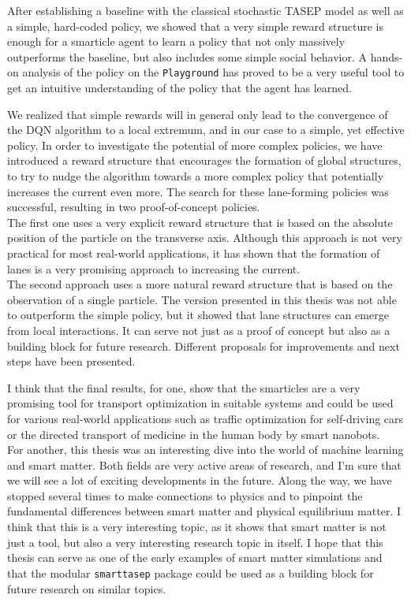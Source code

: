 After establishing a baseline with the classical stochastic TASEP model as well as a simple, hard-coded policy, we showed that a very simple reward structure is enough for a smarticle agent to learn a policy that not only massively outperforms the baseline, but also includes some simple social behavior. A hands-on analysis of the policy on the \texttt{Playground} has proved to be a very useful tool to get an intuitive understanding of the policy that the agent has learned.


We realized that simple rewards will in general only lead to the convergence of the DQN algorithm to a local extremum, and in our case to a simple, yet effective policy. In order to investigate the potential of more complex policies, we have introduced a reward structure that encourages the formation of global structures, to try to nudge the algorithm towards a more complex policy that potentially increases the current even more. The search for these lane-forming policies was successful, resulting in two proof-of-concept policies. 
\\
The first one uses a very explicit reward structure that is based on the absolute position of the particle on the transverse axis. Although this approach is not very practical for most real-world applications, it has shown that the formation of lanes is a very promising approach to increasing the current. 
\\
The second approach uses a more natural reward structure that is based on the observation of a single particle. The version presented in this thesis was not able to outperform the simple policy, but it showed that lane structures can emerge from local interactions. It can serve not just as a proof of concept but also as a building block for future research. Different proposals for improvements and next steps have been presented. 


I think that the final results, for one, show that the smarticles are a very promising tool for transport optimization in suitable systems and could be used for various real-world applications such as traffic optimization for self-driving cars or the directed transport of medicine in the human body by smart nanobots. 
\\
For another, this thesis was an interesting dive into the world of machine learning and smart matter. Both fields are very active areas of research, and I'm sure that we will see a lot of exciting developments in the future. Along the way, we have stopped several times to make connections to physics and to pinpoint the fundamental differences between smart matter and physical equilibrium matter. I think that this is a very interesting topic, as it shows that smart matter is not just a tool, but also a very interesting research topic in itself. I hope that this thesis can serve as one of the early examples of smart matter simulations and that the modular \texttt{smarttasep} package could be used as a building block for future research on similar topics. 
